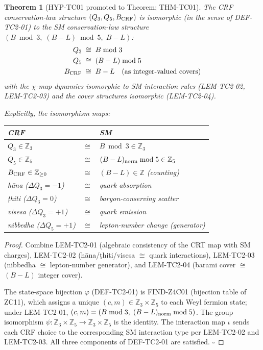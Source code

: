 \documentclass[12pt, a4paper]{article}
\newtheorem{theorem}{Theorem}[section]
\begin{document}
\begin{theorem}[HYP-TC01 promoted to Theorem; THM-TC01]
\label{thm:TC01}
The CRF conservation-law structure $(Q_3, Q_5, B_{\rm CRF})$
is isomorphic (in the sense of DEF-TC2-01) to the SM conservation-law
structure $(B\bmod 3,\; (B-L)\bmod 5,\; B-L)$:
\begin{align}
  Q_3 &\;\cong\; B \bmod 3
  \label{eq:final-Q3} \\
  Q_5 &\;\cong\; (B-L) \bmod 5
  \label{eq:final-Q5} \\
  B_{\rm CRF} &\;\cong\; B - L \quad \text{(as integer-valued covers)}
  \label{eq:final-B}
\end{align}
with the $\chi$-map dynamics isomorphic to SM interaction rules
(LEM-TC2-02, LEM-TC2-03) and the cover structures isomorphic
(LEM-TC2-04).

Explicitly, the isomorphism maps:
\begin{center}
{\small
\renewcommand{\arraystretch}{1.25}
\begin{tabular}{p{5.5cm} p{0.8cm} p{5.5cm}}
\toprule
\textbf{CRF} & & \textbf{SM} \\
\midrule
$Q_3 \in \mathbb{Z}_3$ & $\cong$ & $B \bmod 3 \in \mathbb{Z}_3$ \\
$Q_5 \in \mathbb{Z}_5$ & $\cong$ & $(B-L)_{\rm norm} \bmod 5 \in \mathbb{Z}_5$ \\
$B_{\rm CRF} \in \mathbb{Z}_{\geq 0}$ & $\cong$ & $(B-L) \in \mathbb{Z}$ (counting) \\
hāna ($\Delta Q_3 = -1$) & $\cong$ & quark absorption \\
ṭhiti ($\Delta Q_3 = 0$) & $\cong$ & baryon-conserving scatter \\
visesa ($\Delta Q_3 = +1$) & $\cong$ & quark emission \\
nibbedha ($\Delta Q_5 = +1$) & $\cong$ & lepton-number change (generator) \\
\bottomrule
\end{tabular}
}
\end{center}
\end{theorem}

\begin{proof}
Combine LEM-TC2-01 (algebraic consistency of the CRT map with SM
charges), LEM-TC2-02 (hāna/ṭhiti/visesa $\cong$ quark interactions),
LEM-TC2-03 (nibbedha $\cong$ lepton-number generator), and
LEM-TC2-04 (barami cover $\cong$ $(B-L)$ integer cover).

The state-space bijection $\varphi$ (DEF-TC2-01) is FIND-Z4C01
(bijection table of ZC11), which assigns a unique $(c,m) \in
\mathbb{Z}_3 \times \mathbb{Z}_5$ to each Weyl fermion state; under
LEM-TC2-01, $(c,m) = (B\bmod 3,\; (B-L)_{\rm norm}\bmod 5)$.
The group isomorphism $\psi: \mathbb{Z}_3 \times \mathbb{Z}_5
\to \mathbb{Z}_3 \times \mathbb{Z}_5$ is the identity.
The interaction map $\iota$ sends each CRF choice to the
corresponding SM interaction type per LEM-TC2-02 and LEM-TC2-03.
All three components of DEF-TC2-01 are satisfied. \hfill$\square$
\end{proof}
\end{document}
